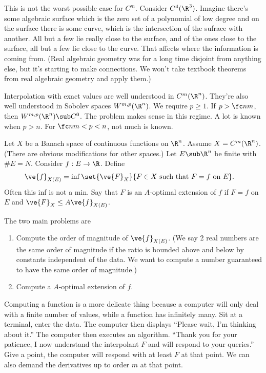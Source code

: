 This is not the worst possible case for $C^m$. Consider $C^4(\R^3)$. Imagine there's some algebraic surface which is the zero set of a polynomial of low degree and on the surface there is some curve, which is the intersection of the sufrace with another. All but a few lie really close to the surface, and of the ones close to the surface, all but a few lie close to the curve. That affects where the information is coming from. 
(Real algebraic geometry was for a long time disjoint from anything else, but it's starting to make connections. We won't take textbook theorems from real algebraic geometry and apply them.)

Interpolation with exact values are well understood in $C^m(\R^n)$. They're also well understood in Sobolev spaces $W^{m,p}(\R^n)$. We require $p\ge 1$. If $p>\fc nm$, then $W^{m,p}(\R^n)\sub C^0$. 
The problem makes sense in this regime. A lot is known when $p>n$. For $\fc nm < p< n$, not much is known.

Let $X$ be a Banach space of continuous functions on $\R^n$. Assume $X=C^m(\R^n)$. (There are obvious modifications for other spaces.) %
Let $E\sub \R^n$ be finite with $\# E=N$. %
Consider $f:E\to \R$. 
Define
\begin{align}
\ve{f}_{X(E)} &= \inf\set{\ve{F}_X}{F\in X \text{ such that } F=f\text{ on }E}.
\end{align}
Often this inf is not a min. 
Say that $F$ is an $A$-optimal extension of $f$ if $F=f$ on $E$ and $\ve{F}_X \le A\ve{f}_{X(E)}$. 

The two main problems are
\begin{enumerate}
\item
Compute the order of magnitude of $\ve{f}_{X(E)}$. 
(We say 2 real numbers are the same order of magnitude if the ratio is bounded above and below by constants independent of the data. We want to compute a number guaranteed to have the same order of magnitude.)
\item
Compute a $A$-optimal extension of $f$. 
\end{enumerate}
Computing a function is a more delicate thing because a computer will only deal with a finite number of values, while a function has infinitely many. Sit at a terminal, enter the data. The computer then displays ``Please wait, I'm thinking about it.'' The computer then executes an algorithm. ``Thank you for your patience, I now understand the interpolant $F$ and will respond to your queries.'' Give a point, the computer will respond with at least $F$ at that point. We can also demand the derivatives up to order $m$ at that point.

